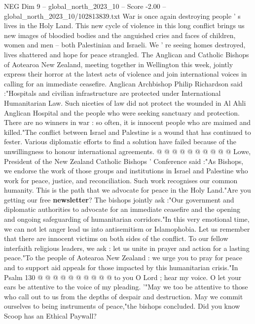 \begin{textsample}{NEG Dim 9 – global\_north\_2023\_10 – Score -2.00 – global\_north\_2023\_10/102813839.txt}  \label{ex:f9_neg_153}
War is once again destroying people ' s lives in the Holy Land.
This new cycle of violence in this long conflict brings us new images of bloodied bodies and the anguished cries and faces of children, women and men -- both Palestinian and Israeli.
We ' re seeing homes destroyed, lives shattered and hope for peace strangled.
The Anglican and Catholic Bishops of Aotearoa New Zealand, meeting together in Wellington this week, jointly express their horror at the latest acts of violence and join international voices in calling for an immediate ceasefire.
Anglican Archbishop Philip Richardson said :"Hospitals and civilian infrastructure are protected under International Humanitarian Law.
Such niceties of law did not protect the wounded in Al Ahli Anglican Hospital and the people who were seeking sanctuary and protection.
There are no winners in war : so often, it is innocent people who are maimed and killed."The conflict between Israel and Palestine is a wound that has continued to fester.
Various diplomatic efforts to find a solution have failed because of the unwillingness to honour international agreements. @ @ @ @ @ @ @ @ @ @ Lowe, President of the New Zealand Catholic Bishops ' Conference said :"As Bishops, we endorse the work of those groups and institutions in Israel and Palestine who work for peace, justice, and reconciliation.
Such work recognises our common humanity.
This is the path that we advocate for peace in the Holy Land."Are you getting our free \textbf{newsletter}?
The bishops jointly ask :"Our government and diplomatic authorities to advocate for an immediate ceasefire and the opening and ongoing safeguarding of humanitarian corridors."In this very emotional time, we can not let anger lead us into antisemitism or Islamophobia.
Let us remember that there are innocent victims on both sides of the conflict.
To our fellow interfaith religious leaders, we ask : let us unite in prayer and action for a lasting peace."To the people of Aotearoa New Zealand : we urge you to pray for peace and to support aid appeals for those impacted by this humanitarian crisis."In Psalm 130 @ @ @ @ @ @ @ @ @ @ to you O Lord ; hear my voice.
O let your ears be attentive to the voice of my pleading. '"May we too be attentive to those who call out to us from the depths of despair and destruction.
May we commit ourselves to being instruments of peace,"the bishops concluded.
Did you know Scoop has an Ethical Paywall?

\end{textsample}
